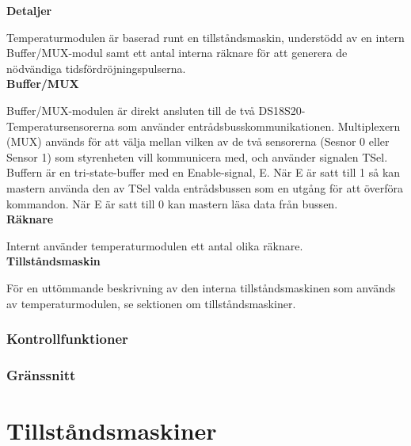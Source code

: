 \documentclass[a4paper,11pt]{article}
\begin{document}
{\noindent \bf Detaljer}

Temperaturmodulen är baserad runt en tillståndsmaskin, understödd av en intern Buffer/MUX-modul samt 
ett antal interna räknare för att generera de nödvändiga tidsfördröjningspulserna.\\

{\noindent \bf Buffer/MUX}

Buffer/MUX-modulen är direkt ansluten till de två DS18S20-Temperatursensorerna som använder entrådsbusskommunikationen.
Multiplexern (MUX) används för att välja mellan vilken av de två sensorerna (Sesnor 0 eller Sensor 1) som styrenheten
vill kommunicera med, och använder signalen TSel.
Buffern är en tri-state-buffer med en Enable-signal, E. När E är satt till 1 så kan mastern använda den av TSel valda
entrådsbussen som en utgång för att överföra kommandon. När E är satt till 0 kan mastern läsa data från bussen.\\

{\noindent \bf Räknare}

Internt använder temperaturmodulen ett antal olika räknare. \\

{\noindent \bf Tillståndsmaskin}

För en uttömmande beskrivning av den interna tillståndsmaskinen som används av temperaturmodulen,
se sektionen om tillståndsmaskiner.\\

		\subsubsection{Kontrollfunktioner}

		\subsubsection{Gränssnitt}

\section{Tillståndsmaskiner}
\end{document}
